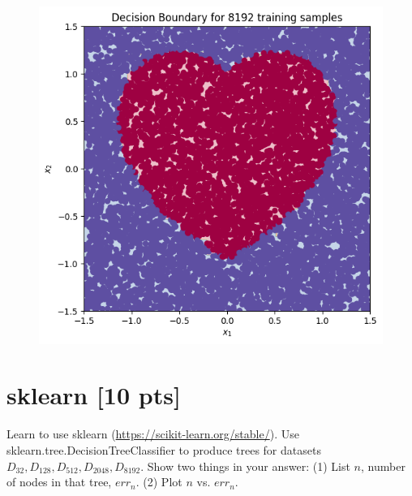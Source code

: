 \documentclass[a4paper]{article}
\theoremstyle{definition}
\newenvironment{soln}{
    \leavevmode\color{blue}\ignorespaces
}{}
\begin{document}
\begin{enumerate}
\begin{itemize}
\begin{soln}
\begin{figure}[H]
\begin{subfigure}{0.5\textwidth}
            \label{fig:q7_2048}
        \end{subfigure}
    \end{figure}
    \begin{figure}[H]
        \centering
        \includegraphics[scale=0.4]{Images/Q7/DTq7_8192.png}
        \label{fig:q7_8192}
    \end{figure}
    
  \end{soln}
  \end{itemize}
  
\end{enumerate}

\section{sklearn [10 pts]}
Learn to use sklearn (\url{https://scikit-learn.org/stable/}).
Use sklearn.tree.DecisionTreeClassifier to produce trees for datasets $D_{32}, D_{128}, D_{512}, D_{2048}, D_{8192}$.  Show two things in your answer: (1) List $n$, number of nodes in that tree, $err_n$. (2) Plot $n$ vs. $err_n$.
\end{document}
